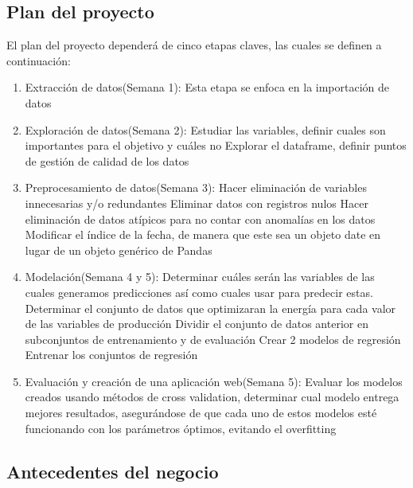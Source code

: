 \documentclass{article}
\begin{document}
\subsection{Plan del proyecto}
El plan del proyecto dependerá de cinco etapas claves, las cuales se definen a continuación:
\begin{enumerate}
    \item Extracción de datos(Semana 1):
    \subitem Esta etapa se enfoca en la importación de datos
    
    \item Exploración de datos(Semana 2):
    \subitem Estudiar las variables, definir cuales son importantes para el objetivo y cuáles no
    \subitem Explorar el dataframe, definir puntos de gestión de calidad de los datos
    
     \item Preprocesamiento de datos(Semana 3):
    \subitem Hacer eliminación de variables innecesarias y/o redundantes
    \subitem Eliminar datos con registros nulos
    \subitem Hacer eliminación de datos atípicos para no contar con anomalías en los datos
    \subitem Modificar el índice de la fecha, de manera que este sea un objeto date en lugar de un objeto genérico de Pandas
    
    \item Modelación(Semana 4 y 5):
    \subitem Determinar cuáles serán las variables de las cuales generamos predicciones así como cuales usar para predecir estas.
    \subitem Determinar el conjunto de datos que optimizaran la energía para cada valor de las variables de producción
    \subitem Dividir el conjunto de datos anterior en subconjuntos de entrenamiento y de evaluación  
    \subitem Crear 2 modelos de regresión
    \subitem Entrenar los conjuntos de regresión
    
    \item Evaluación y creación de una aplicación web(Semana 5):
    \subitem Evaluar los modelos creados usando métodos de cross validation, determinar cual modelo entrega mejores resultados, asegurándose de que cada uno de estos modelos esté funcionando con los parámetros óptimos, evitando el overfitting


\end{enumerate}




\subsection{Antecedentes del negocio}
\end{document}
